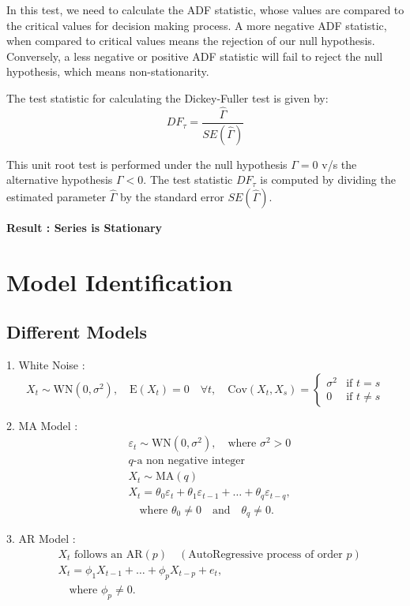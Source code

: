 \documentclass{article}
\begin{document}
In this test, we need to calculate the ADF statistic, whose values are compared to the critical values for decision making process. A more negative ADF statistic, when compared to critical values means the rejection of our null hypothesis.
Conversely, a less negative or positive ADF statistic will fail to reject the null hypothesis, which means non-stationarity.


The test statistic for calculating the Dickey-Fuller test is given by:
\[ DF_\tau = \frac{\hat{\Gamma}}{SE(\hat{\Gamma})} \]

This unit root test is performed under the null hypothesis \( \Gamma = 0 \) v/s the alternative hypothesis \( \Gamma < 0 \). The test statistic \( DF_\tau \) is computed by dividing the estimated parameter \( \hat{\Gamma} \) by the standard error \( SE(\hat{\Gamma}) \).

\textbf{Result : Series is Stationary}


\section{Model Identification}
\subsection{Different Models}
1. White Noise : 
\[
X_t \sim \text{WN}(0, \sigma^2), \quad \text{E}(X_t) = 0 \quad \forall t, \quad \text{Cov}(X_t, X_s) = 
\begin{cases}
    \sigma^2 & \text{if } t = s \\
    0 & \text{if } t \neq s
\end{cases}
\]

2. MA Model :
\[
\begin{aligned}
& \varepsilon_t \sim \text{WN}(0, \sigma^2), \quad \text{where } \sigma^2 > 0 \\
& q\text{-a non negative integer} \\
& X_t \sim \text{MA}(q) \\
& X_t = \theta_0 \varepsilon_t + \theta_1 \varepsilon_{t-1} + \ldots + \theta_q \varepsilon_{t-q}, \\
& \quad \text{where } \theta_0 \neq 0 \quad \text{and} \quad \theta_q \neq 0.
\end{aligned}
\]

3. AR Model :
\[
\begin{aligned}
& X_t \text{ follows an AR}(p) \quad (\text{AutoRegressive process of order } p) \\
& X_t = \phi_1 X_{t-1} + \ldots + \phi_p X_{t-p} + e_t, \\
& \quad \text{where } \phi_p \neq 0.
\end{aligned}
\]
\end{document}
